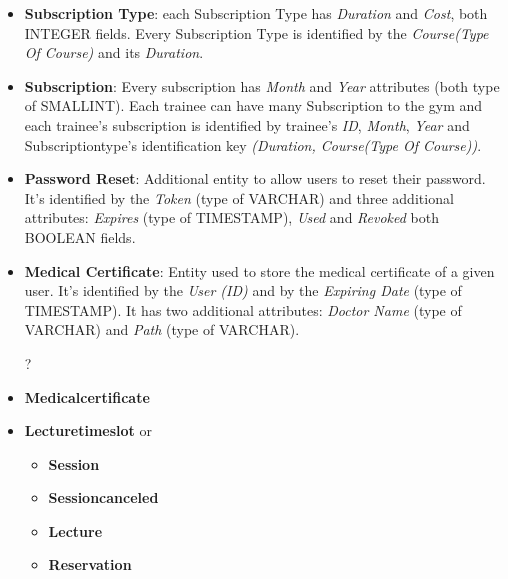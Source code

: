 \begin{itemize}
    	\item \textbf{Subscription Type}: each Subscription Type has \textit{Duration} and \textit{Cost}, both INTEGER fields. Every Subscription Type is identified by the \textit{Course(Type Of Course)} and its \textit{Duration}.
    	
    	\item \textbf{Subscription}: Every subscription has \textit{Month} and \textit{Year} attributes (both type of SMALLINT). Each trainee can have many Subscription to the gym and each trainee's subscription is identified by trainee's \textit{ID}, \textit{Month}, \textit{Year} and Subscription\textunderscore type's identification key \textit{(Duration, Course(Type Of Course))}.
    	
    	\item \textbf{Password Reset}: Additional entity to allow users to reset their password. It's identified by the \textit{Token} (type of VARCHAR) and three additional attributes: \textit{Expires} (type of TIMESTAMP), \textit{Used} and \textit{Revoked} both BOOLEAN fields.
        
        \item \textbf{Medical Certificate}: Entity used to store the medical certificate of a given user. It's identified by the \textit{User (ID)} and by the \textit{Expiring Date} (type of TIMESTAMP). It has two additional attributes: \textit{Doctor Name} (type of VARCHAR) and \textit{Path} (type of VARCHAR).
        	
    	\color{red}
    	\item[?]
    	\item \textbf{Medical\textunderscore certificate}
    	
    	\item \textbf{Lecture\textunderscore time\textunderscore slot} or
		\begin{itemize}
    	    \item \textbf{Session}
		    \item \textbf{Session\textunderscore canceled}
		    \item \textbf{Lecture}
		    \item \textbf{Reservation}
    	\end{itemize}
		\color{black}
	
    \end{itemize}